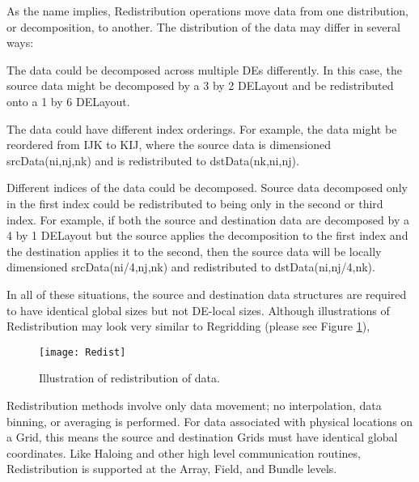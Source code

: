 

As the name implies, Redistribution operations move data from one distribution,
or decomposition, to another.  The distribution of the data may differ in several 
ways:
 \begin{description}

  \item The data could be decomposed across multiple DEs differently.  In this
        case, the source data might be decomposed by a 3 by 2 DELayout and be
        redistributed onto a 1 by 6 DELayout.

  \item The data could have different index orderings.  For example, the data
        might be reordered from IJK to KIJ, where the source data is
        dimensioned srcData(ni,nj,nk) and is redistributed to dstData(nk,ni,nj).

  \item Different indices of the data could be decomposed.  Source data
        decomposed only in the first index could be redistributed to being
        only in the second or third index.  For example, if both the source
        and destination data are decomposed by a 4 by 1 DELayout but the source
        applies the decomposition to the first index and the destination
        applies it to the second, then the source data will be locally
        dimensioned srcData(ni/4,nj,nk) and redistributed to dstData(ni,nj/4,nk).

 \end{description}

In all of these situations, the source and destination data structures are
required to have identical global sizes but not DE-local sizes.  Although
illustrations of Redistribution may look very similar to Regridding (please
see Figure \ref{fig:Redist}),

\begin{center}
\begin{figure}
\label{fig:Redist}
\texttt{[image: Redist]}
\caption{Illustration of redistribution of data. }
\end{figure}
\end{center}

Redistribution methods involve only data movement; no interpolation, data
binning, or averaging is performed.  For data associated with physical locations
on a Grid, this means the source and destination Grids must have identical
global coordinates.  Like Haloing and other high level communication routines,
Redistribution is supported at the Array, Field, and Bundle levels. 

